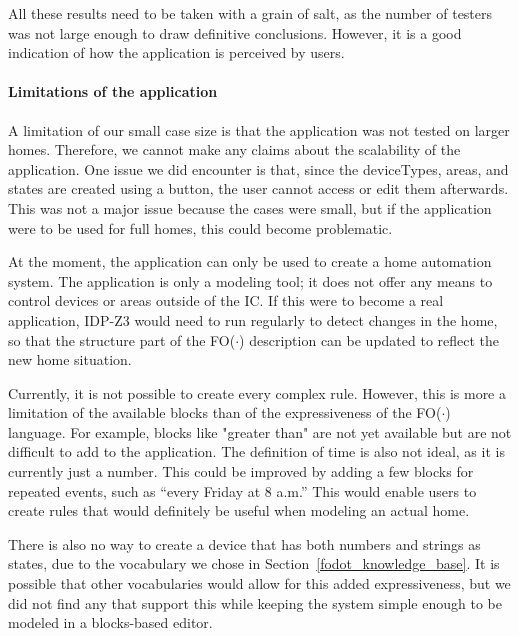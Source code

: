 \documentclass[11pt,a4paper]{report}
\newcommand{\fodot}{FO($\cdot$)\xspace}
\begin{document}
\begin{idplisting}
All these results need to be taken with a grain of salt, as the number of testers was not large enough to draw definitive conclusions. However, it is a good indication of how the application is perceived by users.

\paragraph{Limitations of the application}
A limitation of our small case size is that the application was not tested on larger homes. Therefore, we cannot make any claims about the scalability of the application. One issue we did encounter is that, since the deviceTypes, areas, and states are created using a button, the user cannot access or edit them afterwards. This was not a major issue because the cases were small, but if the application were to be used for full homes, this could become problematic.

At the moment, the application can only be used to create a home automation system. The application is only a modeling tool; it does not offer any means to control devices or areas outside of the IC. If this were to become a real application, IDP-Z3 would need to run regularly to detect changes in the home, so that the structure part of the \fodot description can be updated to reflect the new home situation.

Currently, it is not possible to create every complex rule. However, this is more a limitation of the available blocks than of the expressiveness of the \fodot language. For example, blocks like "greater than" are not yet available but are not difficult to add to the application. The definition of time is also not ideal, as it is currently just a number. This could be improved by adding a few blocks for repeated events, such as “every Friday at 8 a.m.” This would enable users to create rules that would definitely be useful when modeling an actual home.

There is also no way to create a device that has both numbers and strings as states, due to the vocabulary we chose in Section~\ref{fodot_knowledge_base}. It is possible that other vocabularies would allow for this added expressiveness, but we did not find any that support this while keeping the system simple enough to be modeled in a blocks-based editor.



\end{idplisting}
\end{document}
